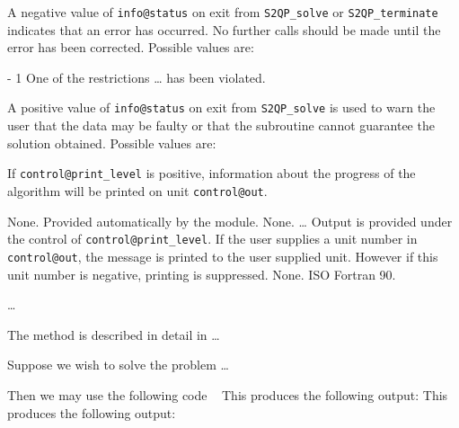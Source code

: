 \documentclass{galahad}
\newcommand{\packagename}{S2QP}
\begin{document}

\galreverse


\galerrors
A negative value of {\tt info@status} on exit from 
{\tt \packagename\_solve}
or 
{\tt \packagename\_terminate}
indicates that an error has occurred. No further calls should be made
until the error has been corrected. Possible values are:

\begin{description}
\item{- 1 } One of the restrictions \ldots
          has been violated.
\end{description}
A positive value of {\tt info@status} on exit from 
{\tt \packagename\_solve}
is used to warn the user that the data may be faulty or that 
the subroutine cannot guarantee the solution obtained.
Possible values are:



\galinfo
If {\tt control@print\_level} is positive, information about the progress 
of the algorithm will be printed on unit {\tt control@out}.


\galgeneral

\galcommon None.
\galworkspace Provided automatically by the module.
\galroutines None. 
\galmodules \ldots
\galio Output is provided under the control of {\tt control@print\_level}.
     If the user supplies a unit number in {\tt control@out}, the message
     is printed to the user supplied unit. However if this unit
     number is negative, printing is suppressed.
\galrestrictions None.
\galportability ISO Fortran 90.


\galmethod
\ldots

\galreference
The method is described in detail in \ldots


\galexample
Suppose we wish to solve the problem \ldots

\noindent
Then we may use the following code
{\tt \small
\VerbatimInput{\packageexample}
}
\noindent
This produces the following output:
This produces the following output:
{\tt \small
\VerbatimInput{\packageresults}
}
\noindent
\end{document}

